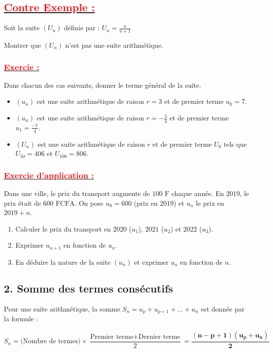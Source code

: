 \documentclass[12pt,a4paper]{article}
\begin{document}
\subsection*{\underline{\textbf{\textcolor{red}{Contre Exemple :}}}}
Soit la suite $(U_n)$ définie par : $U_{n}=\frac{n}{n+1}$

Montrer que $(U_n)$ n’est pas une suite arithmétique.

\subsubsection*{\underline{\textbf{\textcolor{red}{Exercie :}}}}
Dans chacun des cas suivants, donner le terme général de la suite.
\begin{itemize}
\item[1.]$(u_n)$ est une suite arithmétique de raison $r = 3$ et de premier terme $u_{0}= 7$.
\item[2.]$(u_n)$ est une suite arithmétique de raison $r=-\frac{3}{4}$ et de premier terme 
$u_{1}=\frac{-7}{4}$.
\item[3.] $(U_n)$ est une suite arithmétique de raison $r$ et de premier terme $U_{0}$ tels que $U_{50} = 406$ et $U_{100} = 806$.
\end{itemize}

\subsubsection*{\underline{\textbf{\textcolor{red}{Exercie d'application  :}}}}

Dans une ville, le prix du transport augmente de $100\text{ F}$ chaque année. En $2019$, le prix était de $600\text{ FCFA}$.
On pose $u_0 = 600$ (prix en $2019$) et $u_n$ le prix en $2019 + n$.
\begin{enumerate}
    \item Calculer le prix du transport en $2020$ ($u_1$), $2021$ ($u_2$) et $2022$ ($u_3$).
    \item Exprimer $u_{n+1}$ en fonction de $u_n$.
    \item En déduire la nature de la suite $(u_n)$ et exprimer $u_n$ en fonction de $n$.
\end{enumerate}

\subsection*{\color{myred}2. Somme des termes consécutifs}
Pour une suite arithmétique, la somme $S_n = u_p + u_{p+1} + \dots + u_n$ est donnée par la formule :
\begin{tcolorbox}[colback=red!5!white,colframe=myred]
\[
S_n = \text{(Nombre de termes)} \times \dfrac{\text{Premier terme} + \text{Dernier terme}}{2} = \mathbf{\dfrac{(n - p + 1)(u_p + u_n)}{2}}
\]
\end{tcolorbox}
\end{document}
